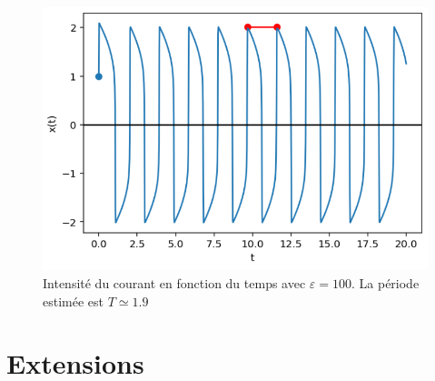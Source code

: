\documentclass{article}
\begin{document}
\begin{figure}[!h]
    \centering
    \includegraphics[scale=0.5]{../images/periode.png}
    \captionsetup{justification=centering,margin=2cm}
    \caption{Intensité du courant en fonction du temps avec $\varepsilon = 100$. La période estimée est $T \simeq 1.9$}
\end{figure}

\section{Extensions}

\[\]
\end{document}
